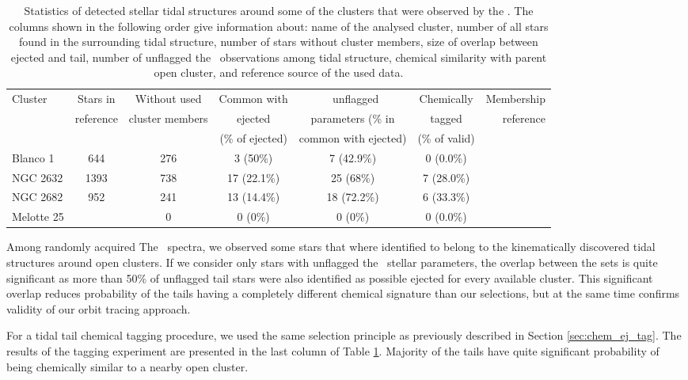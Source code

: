 \begin{table}
	\centering
	\caption{Statistics of detected stellar tidal structures around some of the clusters that were observed by the \Gh. The columns shown in the following order give information about: name of the analysed cluster, number of all stars found in the surrounding tidal structure, number of stars without cluster members, size of overlap between ejected and tail, number of unflagged the \Gh\ observations among tidal structure, chemical similarity with parent open cluster, and reference source of the used data.}
	\begin{tabular}{l | c | c | c | c | c | r }
		\hline
		Cluster & Stars in & Without used & Common with & \Gh\ unflagged & Chemically & Membership\\
		& reference & cluster members & ejected & parameters (\% in & tagged & reference\\
		&  &  & (\% of ejected) & common with ejected) & (\% of valid) & \\
		\hline
		Blanco 1   & 644 & 276 & 3 (50\%) & 7 (42.9\%) & 0 (0.0\%) & \citet{2019arXiv191206657Z} \\
		NGC 2632   & 1393 & 738 & 17 (22.1\%) & 25 (68\%) & 7 (28.0\%) & \citet{2019AA...627A...4R} \\
		NGC 2682   & 952 & 241 & 13 (14.4\%) & 18 (72.2\%) & 6 (33.3\%) & \citet{2019AA...627A.119C} \\
		Melotte 25 & \rb{TBD} & 0 & 0 (0\%) & 0 (0\%) & 0 (0.0\%) & \citet{2019AA...621L...3M} \\
		\hline
	\end{tabular}
	\label{tab:cluster_stats_tails}
\end{table}

Among randomly acquired The \Gh\ spectra, we observed some stars that where identified to belong to the kinematically discovered tidal structures around open clusters. If we consider only stars with unflagged the \Gh\ stellar parameters, the overlap between the sets is quite significant as more than 50\% of unflagged tail stars were also identified as possible ejected for every available cluster. This significant overlap reduces probability of the tails having a completely different chemical signature than our selections, but at the same time confirms validity of our orbit tracing approach. 

For a tidal tail chemical tagging procedure, we used the same selection principle as previously described in Section \ref{sec:chem_ej_tag}. The results of the tagging experiment are presented in the last column of Table \ref{tab:cluster_stats_tails}. Majority of the tails have quite significant probability of being chemically similar to a nearby open cluster. 

